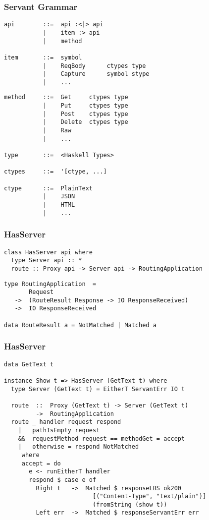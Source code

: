 \documentclass{beamer}
\begin{document}
\begin{frame}[fragile]
\frametitle{Servant Grammar}
\begin{verbatim}
api        ::=  api :<|> api
           |    item :> api
           |    method

item       ::=  symbol
           |    ReqBody      ctypes type
           |    Capture      symbol stype
           |    ...
\end{verbatim}
\end{frame}
\begin{frame}[fragile]
\begin{verbatim}
method     ::=  Get     ctypes type
           |    Put     ctypes type
           |    Post    ctypes type
           |    Delete  ctypes type
           |    Raw
           |    ...

type       ::=  <Haskell Types>

ctypes     ::=  '[ctype, ...]

ctype      ::=  PlainText
           |    JSON
           |    HTML
           |    ...
\end{verbatim}
\end{frame}

\begin{frame}[fragile]
\frametitle{HasServer}

\begin{verbatim}
class HasServer api where
  type Server api :: *
  route :: Proxy api -> Server api -> RoutingApplication
\end{verbatim}
\pause
\begin{verbatim}
type RoutingApplication  =
       Request
   ->  (RouteResult Response -> IO ResponseReceived)
   ->  IO ResponseReceived

data RouteResult a = NotMatched | Matched a
\end{verbatim}
\end{frame}

\begin{frame}[fragile]
\frametitle{HasServer}
\begin{verbatim}
data GetText t

instance Show t => HasServer (GetText t) where
  type Server (GetText t) = EitherT ServantErr IO t

  route  ::  Proxy (GetText t) -> Server (GetText t)
         ->  RoutingApplication
  route _ handler request respond
    |   pathIsEmpty request
    &&  requestMethod request == methodGet = accept
    |   otherwise = respond NotMatched
     where
     accept = do
       e <- runEitherT handler
       respond $ case e of
         Right t   ->  Matched $ responseLBS ok200
                         [("Content-Type", "text/plain")]
                         (fromString (show t))
         Left err  ->  Matched $ responseServantErr err
\end{verbatim}
\end{frame}
\end{document}

